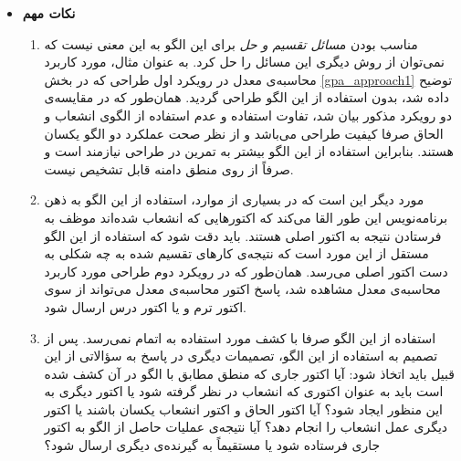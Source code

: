 \begin{itemize}
\item\textbf{نکات مهم}\\
\begin{enumerate}
\item مناسب بودن م\textsl{سائل تقسیم و حل} برای این الگو به این معنی نیست که نمی‌توان از روش دیگری این مسائل را حل کرد. به عنوان مثال، مورد کاربرد محاسبه‌ی معدل در رویکرد  اول طراحی که در بخش \ref{gpa_approach1} توضیح داده شد، بدون استفاده از این الگو طراحی گردید. همان‌طور که در مقایسه‌ی دو رویکرد مذکور بیان شد، تفاوت استفاده و عدم استفاده از الگوی انشعاب و الحاق صرفا کیفیت طراحی می‌باشد و از نظر صحت عملکرد دو الگو یکسان هستند. بنابراین استفاده از این الگو بیشتر به تمرین در طراحی نیازمند است و صرفاً از روی منطق دامنه قابل تشخیص نیست.
\item مورد دیگر این است که در بسیاری از موارد، استفاده از این الگو به ذهن برنامه‌نویس این طور القا می‌کند که اکتورهایی که انشعاب شده‌اند موظف به فرستادن نتیجه به اکتور اصلی هستند. باید دقت شود که استفاده از این الگو مستقل از این مورد است که نتیجه‌ی کارهای تقسیم شده به چه شکلی به دست اکتور اصلی می‌رسد. همان‌طور که در رویکرد دوم طراحی مورد کاربرد محاسبه‌ی معدل مشاهده شد، پاسخ اکتور محاسبه‌ی معدل می‌تواند از سوی اکتور ترم و یا اکتور درس ارسال شود.
\item استفاده از این الگو صرفا با کشف مورد استفاده به اتمام نمی‌رسد. پس از تصمیم به استفاده از این الگو، تصمیمات دیگری در پاسخ به سؤالاتی از این قبیل باید اتخاذ شود: آیا  اکتور جاری که منطق مطابق با الگو در آن کشف شده است باید به عنوان اکتوری که انشعاب در نظر گرفته شود یا اکتور دیگری به این منظور ایجاد شود؟ آیا اکتور الحاق و اکتور انشعاب یکسان باشند یا اکتور دیگری عمل انشعاب را انجام دهد؟ آیا نتیجه‌ی عملیات حاصل از الگو به اکتور جاری فرستاده شود یا مستقیماً به گیرنده‌ی دیگری ارسال شود؟ 
\end{enumerate} 

\end{itemize}

